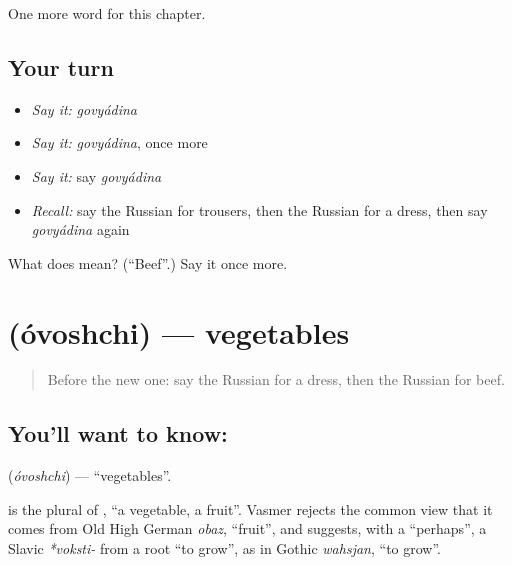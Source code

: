 \begin{grammarlens}[title={What you've built}]
One more word for this chapter.
\end{grammarlens}

\subsection*{Your turn}
\begin{itemize}
\raggedright
  \item \emph{Say it:} \emph{govyádina}
  \item \emph{Say it:} \emph{govyádina}, once more
  \item \emph{Say it:} say \emph{govyádina}
  \item \emph{Recall:} say the Russian for trousers, then the Russian for a dress, then say \emph{govyádina} again
\end{itemize}

\begin{tcolorbox}[breakable,colback=teal!4,colframe=teal!35!black,title={Before you move on}]
What does  mean? (\textquotedblleft{}Beef\textquotedblright{}.) Say it once more.
\end{tcolorbox}
\section[\texorpdfstring{\ru{овощи} (óvoshchi)}{овощи (óvoshchi)}]{ (óvoshchi) — vegetables}

\label{lesson:RU-C104-vegetables}



\begin{quote}
Before the new one: say the Russian for a dress, then the Russian for beef.
\end{quote}

\subsection*{You'll want to know: }
\textbf{} (\emph{óvoshchi}) — \textquotedblleft{}vegetables\textquotedblright{}.

\begin{cousinweb}
\textbf{} is the plural of \emph{}, \textquotedblleft{}a vegetable, a fruit\textquotedblright{}. Vasmer rejects the common view that it comes from Old High German \emph{obaz}, \textquotedblleft{}fruit\textquotedblright{}, and suggests, with a \textquotedblleft{}perhaps\textquotedblright{}, a Slavic \emph{*voksti-} from a root \textquotedblleft{}to grow\textquotedblright{}, as in Gothic \emph{wahsjan}, \textquotedblleft{}to grow\textquotedblright{}.
\end{cousinweb}

